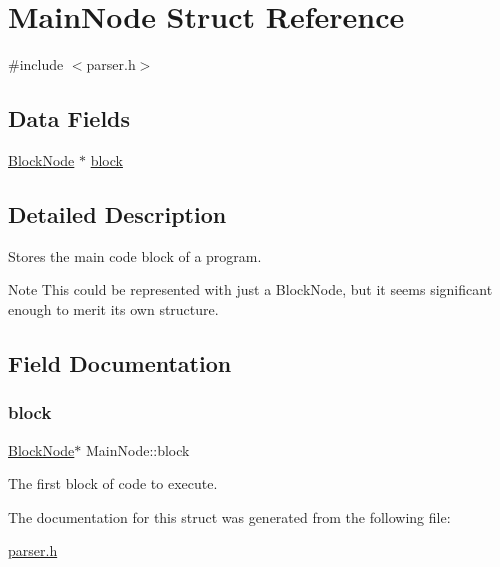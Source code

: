 \hypertarget{struct_main_node}{}\section{Main\+Node Struct Reference}
\label{struct_main_node}


{\ttfamily \#include $<$parser.\+h$>$}

\subsection*{Data Fields}
\begin{DoxyCompactItemize}
\item 
\hyperlink{struct_block_node}{Block\+Node} $\ast$ \hyperlink{struct_main_node_aee302d107abb16c48702c2699a58d49f}{block}
\end{DoxyCompactItemize}


\subsection{Detailed Description}
Stores the main code block of a program.

\begin{DoxyNote}{Note}
This could be represented with just a Block\+Node, but it seems significant enough to merit its own structure. 
\end{DoxyNote}


\subsection{Field Documentation}
\mbox{\label{struct_main_node_aee302d107abb16c48702c2699a58d49f}} 
\subsubsection{\texorpdfstring{block}{block}}
{\footnotesize\ttfamily \hyperlink{struct_block_node}{Block\+Node}$\ast$ Main\+Node\+::block}

The first block of code to execute. 

The documentation for this struct was generated from the following file\+:\begin{DoxyCompactItemize}
\item 
\hyperlink{parser_8h}{parser.\+h}\end{DoxyCompactItemize}
